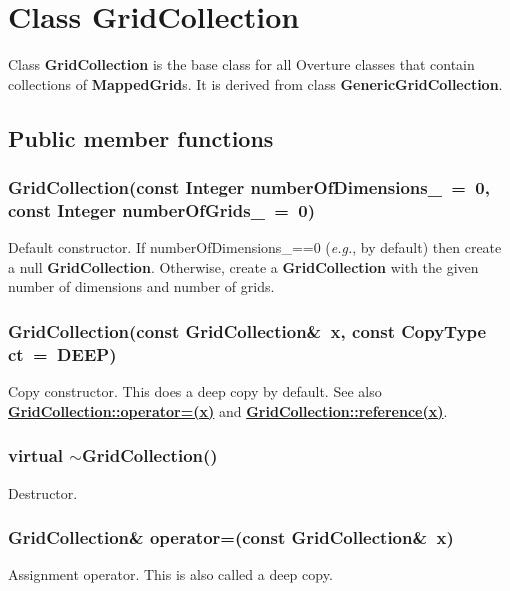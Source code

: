 \documentclass{article}
\begin{document}
\section{Class GridCollection} 
\label{GridCollection}

Class \textbf{GridCollection} is the base class for all Overture classes that contain collections of \textbf{MappedGrid}s.
It is derived from class \textbf{GenericGridCollection}.

\subsection{Public member functions}
\label{GridCollection::PublicMemberFunctions}

  \subsubsection{GridCollection(const Integer numberOfDimensions\_~=~0, const Integer numberOfGrids\_~=~0)}
  \label{GridCollection(numberOfDimensions_,numberOfGrids_)}
    Default constructor.
    If numberOfDimensions\_==0 ({\sl{}e.g.}, by default) then create a null \textbf{GridCollection}.
    Otherwise, create a \textbf{GridCollection} with the given number of dimensions and number of grids.

  \subsubsection{GridCollection(const GridCollection\&~x, const CopyType ct~=~DEEP)}
  \label{GridCollection::GridCollection(x,ct)}
    Copy constructor.  This does a deep copy by default.
    See also {\bf{}\hyperref{operator=(x)}{operator=(x) \rm(\S}{)}{GridCollection::operator=(x)}}
    and {\bf{}\hyperref{reference(x)}{reference(x) \rm(\S}{)}{GridCollection::reference(x)}}.

  \subsubsection{virtual $\sim$GridCollection()}
  \label{GridCollection::tilde_GridCollection()}
    Destructor.

  \subsubsection{GridCollection\& operator=(const GridCollection\&~x)}
  \label{GridCollection::operator=(x)}
    Assignment operator.  This is also called a deep copy.
\end{document}
